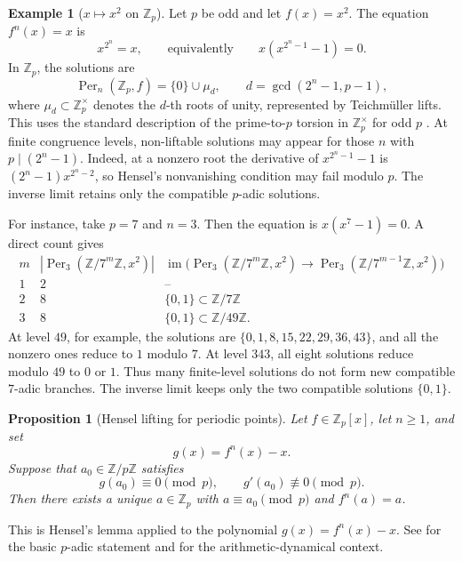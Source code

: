 \documentclass[10pt]{amsart}
\makeatletter
\newcommand{\Per}{\operatorname{Per}}
\newcommand{\Z}{\mathbb{Z}}
\newcommand{\Zp}{\mathbb{Z}_p}
\theoremstyle{plain}
\newtheorem{proposition}[theorem]{Proposition}
\theoremstyle{definition}
\newtheorem{example}[theorem]{Example}
\renewenvironment{proof}[1][\proofname]{\par
  \pushQED{\qed}%
  \normalfont \topsep6\p@\@plus6\p@\relax
  \trivlist
  \item[\hskip\labelsep\itshape #1\@addpunct{:}]\ignorespaces
}{%
  \popQED\endtrivlist\@endpefalse
}
\makeatother
\begin{document}
\begin{example}[$x\mapsto x^2$ on $\Zp$]
Let $p$ be odd and let $f(x)=x^2$. The equation $f^n(x)=x$ is
\[
  x^{2^n}=x,
  \qquad\text{equivalently}\qquad
  x(x^{2^n-1}-1)=0.
\]
In $\Zp$, the solutions are
\[
  \Per_n(\Zp,f)=\{0\}\cup\mu_d,
  \qquad d=\gcd(2^n-1,p-1),
\]
where $\mu_d\subset\Zp^\times$ denotes the $d$-th roots of unity, represented
by Teichmüller lifts. This uses the standard description of the prime-to-$p$
torsion in $\Zp^\times$ for odd $p$ \cite{GouveaPadic}. At finite congruence
levels, non-liftable solutions may appear for those $n$ with
$p\mid(2^n-1)$. Indeed, at a nonzero root the derivative of
$x^{2^n-1}-1$ is $(2^n-1)x^{2^n-2}$, so Hensel's nonvanishing condition may
fail modulo $p$. The inverse limit retains only the compatible $p$-adic
solutions.

For instance, take $p=7$ and $n=3$. Then the equation is $x(x^7-1)=0$. A direct
count gives
\[
\begin{array}{c|c|c}
m & |\Per_3(\Z/7^m\Z,x^2)| &
\operatorname{im}\bigl(\Per_3(\Z/7^m\Z,x^2)\to
\Per_3(\Z/7^{m-1}\Z,x^2)\bigr)
\\ \hline
1 & 2 & \text{--}\\
2 & 8 & \{0,1\}\subset \Z/7\Z\\
3 & 8 & \{0,1\}\subset \Z/49\Z.
\end{array}
\]
At level \(49\), for example, the solutions are
\(\{0,1,8,15,22,29,36,43\}\), and all the nonzero ones reduce to \(1\) modulo
\(7\). At level \(343\), all eight solutions reduce modulo \(49\) to \(0\) or
\(1\). Thus many finite-level solutions do not form new compatible
\(7\)-adic branches. The inverse limit keeps only the two compatible solutions
\(\{0,1\}\).
\end{example}

\begin{proposition}[Hensel lifting for periodic points]
\label{prop:hensel}
Let $f\in\Zp[x]$, let $n\ge1$, and set
\[
  g(x)=f^n(x)-x.
\]
Suppose that $a_0\in\Z/p\Z$ satisfies
\[
  g(a_0)\equiv0\pmod p,
  \qquad
  g'(a_0)\not\equiv0\pmod p.
\]
Then there exists a unique $a\in\Zp$ with $a\equiv a_0\pmod p$ and
$f^n(a)=a$.
\end{proposition}

\begin{proof}
This is Hensel's lemma applied to the polynomial $g(x)=f^n(x)-x$. See
\cite{GouveaPadic} for the basic $p$-adic statement and
\cite[Ch.~2]{SilvermanADS} for the arithmetic-dynamical context.
\end{proof}
\end{document}

